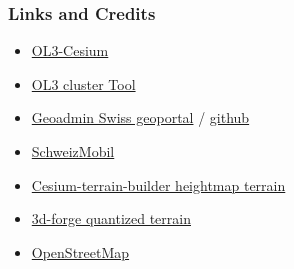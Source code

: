 \documentclass[presentation]{beamer}
\begin{document}
  \begin{frame}
    \frametitle{Links and Credits}
    \begin{itemize}
      \pause\item \href {https://github.com/openlayers/ol3-cesium}{OL3-Cesium}
      \pause\item \href {https://github.com/gberaudo/ol3-cluster-tool}{OL3 cluster Tool}
      \pause\item \href {https://github.com/geoadmin/mf-geoadmin3}{Geoadmin Swiss geoportal} / \href {https://map.geo.admin.ch}{github}
      \pause\item \href {https://map.schweizmobil.ch}{SchweizMobil}
      \pause\item \href {https://github.com/geo-data/cesium-terrain-builder}{Cesium-terrain-builder heightmap terrain}
      \pause\item \href {https://github.com/geoadmin/3d-forge}{3d-forge quantized terrain}
      \pause\item \href {https://www.openstreetmap.org/about}{OpenStreetMap}
    \end{itemize}
  \end{frame}
\end{document}
